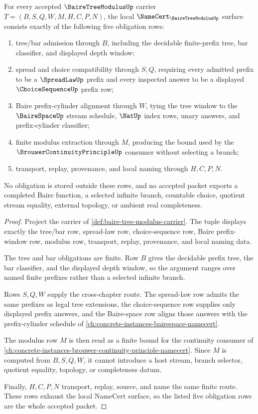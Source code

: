 \begin{theorem}
\label{thm:baire-tree-modulus-namecert-obligations}
For every accepted $\BaireTreeModulusUp$ carrier $T=(B,S,Q,W,M,H,C,P,N)$, the local $\NameCert_{\BaireTreeModulusUp}$ surface consists exactly of the following five obligation rows:
\begin{enumerate}
\item tree/bar admission through $B$, including the decidable finite-prefix tree, bar classifier, and displayed depth window;
\item spread and choice compatibility through $S,Q$, requiring every admitted prefix to be a $\SpreadLawUp$ prefix and every inspected answer to be a displayed $\ChoiceSequenceUp$ prefix row;
\item Baire prefix-cylinder alignment through $W$, tying the tree window to the $\BaireSpaceUp$ stream schedule, $\NatUp$ index rows, unary answers, and prefix-cylinder classifier;
\item finite modulus extraction through $M$, producing the bound used by the $\BrouwerContinuityPrincipleUp$ consumer without selecting a branch;
\item transport, replay, provenance, and local naming through $H,C,P,N$.
\end{enumerate}
No obligation is stored outside these rows, and no accepted packet exports a completed Baire function, a selected infinite branch, countable choice, quotient stream equality, external topology, or ambient real completeness.
\end{theorem}
\begin{proof}
Project the carrier of \autoref{def:baire-tree-modulus-carrier}. The tuple displays exactly the tree/bar row, spread-law row, choice-sequence row, Baire prefix-window row, modulus row, transport, replay, provenance, and local naming data.

The tree and bar obligations are finite. Row $B$ gives the decidable prefix tree, the bar classifier, and the displayed depth window, so the argument ranges over named finite prefixes rather than a selected infinite branch.

Rows $S,Q,W$ supply the cross-chapter route. The spread-law row admits the same prefixes as legal tree extensions, the choice-sequence row supplies only displayed prefix answers, and the Baire-space row aligns those answers with the prefix-cylinder schedule of \autoref{ch:concrete-instances-bairespace-namecert}.

The modulus row $M$ is then read as a finite bound for the continuity consumer of \autoref{ch:concrete-instances-brouwer-continuity-principle-namecert}. Since $M$ is computed from $B,S,Q,W$, it cannot introduce a host stream, branch selector, quotient equality, topology, or completeness datum.

Finally, $H,C,P,N$ transport, replay, source, and name the same finite route. These rows exhaust the local NameCert surface, so the listed five obligation rows are the whole accepted packet.
\end{proof}

